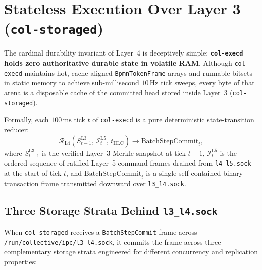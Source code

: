 \section{Stateless Execution Over Layer 3 (\texttt{col-storaged})}
\label{sec:ch3-stateless-execution}

The cardinal durability invariant of Layer~4 is deceptively simple:
\textbf{\texttt{col-execd} holds zero authoritative durable state in volatile RAM}. Although
\texttt{col-execd} maintains hot, cache-aligned \texttt{BpmnTokenFrame} arrays and runnable
bitsets in static memory to achieve sub-millisecond $10\,\mathrm{Hz}$ tick sweeps, every
byte of that arena is a disposable cache of the committed head stored inside Layer~3
(\texttt{col-storaged}).

Formally, each $100\,\mathrm{ms}$ tick $t$ of \texttt{col-execd} is a pure deterministic
state-transition reducer:
\begin{equation}
\mathcal{R}_{\mathrm{L4}}\!\left( S_{t-1}^{\mathrm{L3}}, \, \mathcal{I}_t^{\mathrm{L5}}, \, t_{\mathrm{HLC}} \right) \longrightarrow \mathrm{BatchStepCommit}_t,
\label{eq:ch3-stateless-reducer}
\end{equation}
where $S_{t-1}^{\mathrm{L3}}$ is the verified Layer~3 Merkle snapshot at tick $t-1$,
$\mathcal{I}_t^{\mathrm{L5}}$ is the ordered sequence of ratified Layer~5 command frames
drained from \texttt{l4\_l5.sock} at the start of tick $t$, and $\mathrm{BatchStepCommit}_t$
is a single self-contained binary transaction frame transmitted downward over
\texttt{l3\_l4.sock}.

\subsection{Three Storage Strata Behind \texttt{l3\_l4.sock}}

When \texttt{col-storaged} receives a \texttt{BatchStepCommit} frame across
\texttt{/run/collective/ipc/l3\_l4.sock}, it commits the frame across three complementary
storage strata engineered for different concurrency and replication properties:

